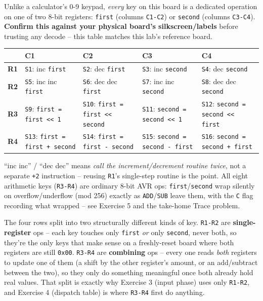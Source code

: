 \documentclass[11pt]{article}
\begin{document}
\begin{summary}
Unlike a calculator's 0-9 keypad, \emph{every} key on this board is a dedicated
operation on one of two 8-bit registers: {\color{accent}\texttt{first}} (columns
\texttt{C1-C2}) or {\color{ok!70!black}\texttt{second}} (columns \texttt{C3-C4}).
\textbf{Confirm this against your physical board's silkscreen/labels} before
trusting any decode -- this table matches this lab's reference board.
\begin{center}
\begin{tabular}{@{}c p{3.15cm} p{3.15cm} p{3.15cm} p{3.15cm}@{}}
\toprule
 & \textbf{C1} & \textbf{C2} & \textbf{C3} & \textbf{C4} \\
\midrule
\textbf{R1} &
{\color{accent}\texttt{S1}: inc \texttt{first}} &
{\color{accent}\texttt{S2}: dec \texttt{first}} &
{\color{ok!70!black}\texttt{S3}: inc \texttt{second}} &
{\color{ok!70!black}\texttt{S4}: dec \texttt{second}} \\
\textbf{R2} &
{\color{accent}\texttt{S5}: inc inc \texttt{first}} &
{\color{accent}\texttt{S6}: dec dec \texttt{first}} &
{\color{ok!70!black}\texttt{S7}: inc inc \texttt{second}} &
{\color{ok!70!black}\texttt{S8}: dec dec \texttt{second}} \\
\textbf{R3} &
{\color{accent}\texttt{S9}: \texttt{first = first << 1}} &
{\color{accent}\texttt{S10}: \texttt{first = first << second}} &
{\color{ok!70!black}\texttt{S11}: \texttt{second = second << 1}} &
{\color{ok!70!black}\texttt{S12}: \texttt{second = second << first}} \\
\textbf{R4} &
{\color{accent}\texttt{S13}: \texttt{first = first + second}} &
{\color{accent}\texttt{S14}: \texttt{first = first - second}} &
{\color{ok!70!black}\texttt{S15}: \texttt{second = second - first}} &
{\color{ok!70!black}\texttt{S16}: \texttt{second = second + first}} \\
\bottomrule
\end{tabular}
\end{center}
``inc inc'' / ``dec dec'' means \emph{call the increment/decrement routine twice},
not a separate \texttt{+2} instruction -- reusing \texttt{R1}'s single-step
routine is the point. All eight arithmetic keys (\texttt{R3-R4}) are ordinary
8-bit AVR ops: \texttt{first}/\texttt{second} wrap silently on overflow/underflow
(mod 256) exactly as \texttt{ADD}/\texttt{SUB} leave them, with the \texttt{C} flag
recording what wrapped -- see Exercise 5 and the take-home Trace problem.

The four rows split into two structurally different kinds of key. \texttt{R1-R2}
are \textbf{single-register} ops -- each key touches only \texttt{first} \emph{or}
only \texttt{second}, never both, so they're the only keys that make sense on a
freshly-reset board where both registers are still \texttt{0x00}. \texttt{R3-R4}
are \textbf{combining} ops -- every one reads \emph{both} registers to update one
of them (a shift by the other register's amount, or an add/subtract between the
two), so they only do something meaningful once both already hold real values.
That split is exactly why Exercise 3 (input phase) uses only \texttt{R1-R2}, and
Exercise 4 (dispatch table) is where \texttt{R3-R4} first do anything.
\end{summary}
\end{document}
